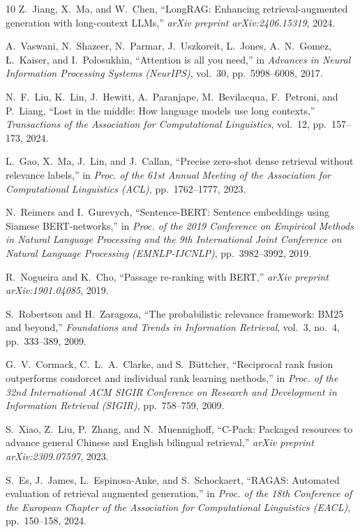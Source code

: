 \documentclass[10pt,journal,compsoc]{IEEEtran}
\begin{document}
\begin{thebibliography}{10}
\footnotesize
\setlength{\itemsep}{1.0pt}
Z.~Jiang, X.~Ma, and W.~Chen, ``LongRAG: Enhancing retrieval-augmented generation with long-context LLMs,'' \textit{arXiv preprint arXiv:2406.15319}, 2024.

A.~Vaswani, N.~Shazeer, N.~Parmar, J.~Uszkoreit, L.~Jones, A.~N.~Gomez, \L.~Kaiser, and I.~Polosukhin, ``Attention is all you need,'' in \textit{Advances in Neural Information Processing Systems (NeurIPS)}, vol.~30, pp.~5998--6008, 2017.

N.~F.~Liu, K.~Lin, J.~Hewitt, A.~Paranjape, M.~Bevilacqua, F.~Petroni, and P.~Liang, ``Lost in the middle: How language models use long contexts,'' \textit{Transactions of the Association for Computational Linguistics}, vol.~12, pp.~157--173, 2024.

L.~Gao, X.~Ma, J.~Lin, and J.~Callan, ``Precise zero-shot dense retrieval without relevance labels,'' in \textit{Proc. of the 61st Annual Meeting of the Association for Computational Linguistics (ACL)}, pp.~1762--1777, 2023.

N.~Reimers and I.~Gurevych, ``Sentence-BERT: Sentence embeddings using Siamese BERT-networks,'' in \textit{Proc. of the 2019 Conference on Empirical Methods in Natural Language Processing and the 9th International Joint Conference on Natural Language Processing (EMNLP-IJCNLP)}, pp.~3982--3992, 2019.

R.~Nogueira and K.~Cho, ``Passage re-ranking with BERT,'' \textit{arXiv preprint arXiv:1901.04085}, 2019.

S.~Robertson and H.~Zaragoza, ``The probabilistic relevance framework: BM25 and beyond,'' \textit{Foundations and Trends in Information Retrieval}, vol.~3, no.~4, pp.~333--389, 2009.

G.~V.~Cormack, C.~L.~A.~Clarke, and S.~B\"{u}ttcher, ``Reciprocal rank fusion outperforms condorcet and individual rank learning methods,'' in \textit{Proc. of the 32nd International ACM SIGIR Conference on Research and Development in Information Retrieval (SIGIR)}, pp.~758--759, 2009.

S.~Xiao, Z.~Liu, P.~Zhang, and N.~Muennighoff, ``C-Pack: Packaged resources to advance general Chinese and English bilingual retrieval,'' \textit{arXiv preprint arXiv:2309.07597}, 2023.

S.~Es, J.~James, L.~Espinosa-Anke, and S.~Schockaert, ``RAGAS: Automated evaluation of retrieval augmented generation,'' in \textit{Proc. of the 18th Conference of the European Chapter of the Association for Computational Linguistics (EACL)}, pp.~150--158, 2024.
\end{thebibliography}
\end{document}
